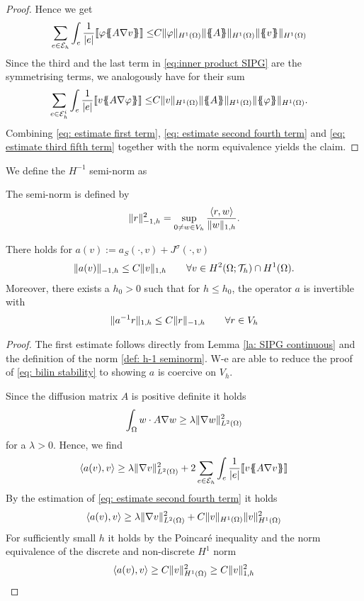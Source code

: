 \begin{proof}
Hence we get
\begin{align}
\sum\limits_{e \in \edges}\int_{e} \frac 1 {|e|}\jump {\varphi \average{A \nabla v} } \leq&
	C \HOnenorm{ \varphi}\HOnenorm{\average A}\HOnenorm{\average{v}}\label{eq: estimate second fourth term}
\end{align}
Since the third and the last term in \eqref{eq:inner product SIPG} are the symmetrising terms, we analogously have for their sum
\begin{align}
\sum\limits_{e \in \edgesi}\int_{e} \frac 1 {|e|}\jump {v \average{A \nabla \varphi} } \leq&
C \HOnenorm{v}\HOnenorm{\average A}\HOnenorm{\average{\varphi}}. \label{eq: estimate third fifth term}
\end{align}
Combining \eqref{eq: estimate first term}, \eqref{eq: estimate second fourth term} and \eqref{eq: estimate third fifth term} together with the norm equivalence yields the claim.
\end{proof}

We define the $H^{-1}$ semi-norm as 
\begin{definition} \label{def: h-1 seminorm}
	The semi-norm is defined by 
	\[
		\lVert r \rVert_{-1,h} ^2 = \sup_{0 \neq w \in V_h} \frac {{ \langle r, w \rangle } } {\lVert w \rVert_{1,h}}.
	\]
\end{definition}

\begin{theorem}[Stability]\label{thm: SIPG stability}
There holds for $a (v):=a_S(\cdot, v)+J^\sigma(\cdot, v)$
	\begin{align}
	 	\lVert a (v) \rVert_{-1,h} \leq C \lVert v \rVert_{1,h} \qquad \forall v \in H^2(\Omega; \mathcal{T}_h) \cap H^1(\Omega). \label{eq: bilin continuity}
	 \end{align}
	 Moreover, there exists a $h_0 > 0$ such that for $h \leq h_0 $, the operator $a$ is invertible with 
	 \begin{align}
	 	\lVert a^{-1} r \rVert_{1,h} \leq C \lVert r \rVert_{-1,h} \qquad \forall r \in V_h \label{eq: bilin stability}
	 \end{align}
\end{theorem}
\begin{proof}
	The first estimate follows directly from Lemma \ref{la: SIPG continuous} and the definition of the norm \ref{def: h-1 seminorm}. W-e are able to reduce the proof of \eqref{eq: bilin stability} to showing $a$ is coercive on $V_h$.
	
	Since the diffusion matrix $A$ is positive definite it holds
	\[
		\int_\Omega  w \cdot A \nabla w \geq \lambda \lVert \nabla w  \rVert_{L^2(\Omega)}^2 
	\]
	for a $\lambda >0$.
	Hence, we find
	\[
		 \langle a(v), v \rangle  \geq \lambda \lVert \nabla v  \rVert_{L^2(\Omega)}^2 + 2 \sum\limits_{e \in \mathcal{E}_h}\int_{e} \frac 1 {|e|}\llbracket v \{\!\!\{ A \nabla v \}\!\!\}  \rrbracket
	\] 
	By the estimation of \eqref{eq: estimate second fourth term} it holds 
		\[
			 \langle a(v), v \rangle  \geq \lambda \lVert \nabla v  \rVert_{L^2(\Omega)}^2 + C \lVert v \rVert_{H^1(\Omega)} \lVert v \rVert_{H^1(\Omega)}^2
		\] 
	For sufficiently small $h$ it holds by the Poincar\'e inequality and the norm equivalence of the discrete and non-discrete $H^1$ norm
	\[
		 \langle a(v), v \rangle  \geq C  \lVert v \rVert_{H^1(\Omega)}^2 \geq C  \lVert v \rVert_{1,h}^2
	\]
\end{proof}

